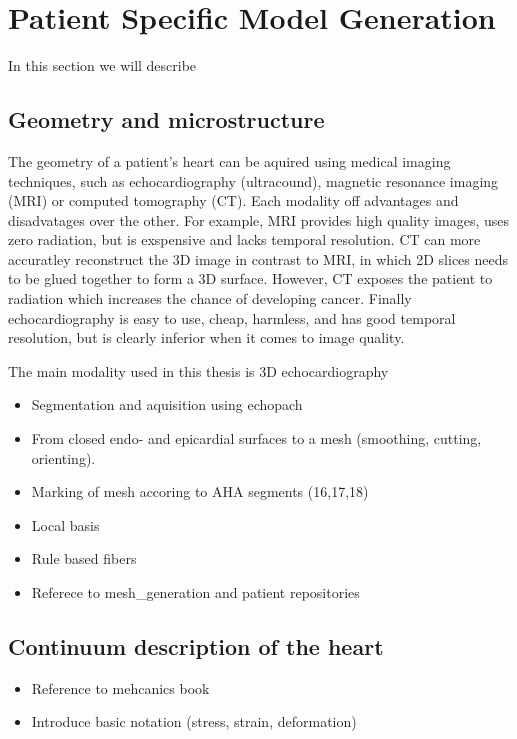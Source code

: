 \section{Patient Specific Model Generation}

In this section we will describe 

\subsection{Geometry and microstructure}

The geometry of a patient's heart can be aquired using medical
imaging techniques, such as echocardiography (ultracound), magnetic
resonance imaging (MRI) or computed tomography (CT). Each modality off
advantages and disadvatages over the other. For example, MRI provides
high quality images, uses zero radiation, but is exspensive and lacks
temporal resolution. CT can more accuratley reconstruct the 3D image
in contrast to MRI, in which 2D slices needs to be glued together to
form a 3D surface. However, CT exposes the patient to radiation which
increases the chance of developing cancer. Finally echocardiography is
easy to use, cheap, harmless, and  has good temporal resolution, but
is clearly inferior when it comes to image quality.

The main modality used in this thesis is 3D echocardiography



\begin{itemize}
  \item Segmentation and aquisition using echopach
  \item From closed endo- and epicardial surfaces to a mesh
    (smoothing, cutting, orienting).
  \item Marking of mesh accoring to AHA segments (16,17,18)
  \item Local basis
  \item Rule based fibers
  \item Referece to mesh{\_}generation and patient repositories
\end{itemize}

\subsection{Continuum description of the heart}

\begin{itemize}
  \item Reference to mehcanics book
  \item Introduce basic notation (stress, strain, deformation)
\end{itemize}

